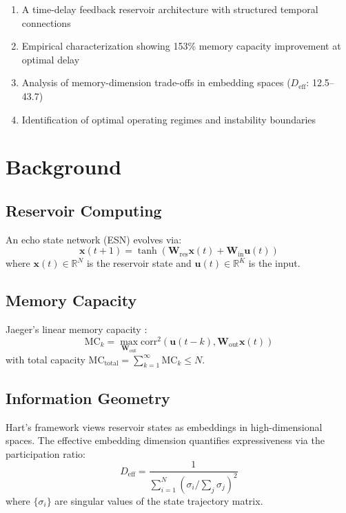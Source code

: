 \documentclass[11pt]{article}
\begin{document}
\begin{enumerate}
\item A time-delay feedback reservoir architecture with structured temporal connections
\item Empirical characterization showing 153\% memory capacity improvement at optimal delay
\item Analysis of memory-dimension trade-offs in embedding spaces ($D_{\text{eff}}$: 12.5--43.7)
\item Identification of optimal operating regimes and instability boundaries
\end{enumerate}

\section{Background}

\subsection{Reservoir Computing}

An echo state network (ESN) evolves via:
\begin{equation}
\mathbf{x}(t+1) = \tanh(\mathbf{W}_{\text{res}}\mathbf{x}(t) + \mathbf{W}_{\text{in}}\mathbf{u}(t))
\end{equation}
where $\mathbf{x}(t) \in \mathbb{R}^N$ is the reservoir state and $\mathbf{u}(t) \in \mathbb{R}^K$ is the input.

\subsection{Memory Capacity}

Jaeger's linear memory capacity \cite{jaeger2001}:
\begin{equation}
\text{MC}_k = \max_{\mathbf{W}_{\text{out}}} \text{corr}^2(\mathbf{u}(t-k), \mathbf{W}_{\text{out}}\mathbf{x}(t))
\end{equation}
with total capacity $\text{MC}_{\text{total}} = \sum_{k=1}^{\infty} \text{MC}_k \leq N$.

\subsection{Information Geometry}

Hart's framework \cite{hart2021thesis} views reservoir states as embeddings in high-dimensional spaces. The effective embedding dimension quantifies expressiveness via the participation ratio:
\begin{equation}
D_{\text{eff}} = \frac{1}{\sum_{i=1}^{N} (\sigma_i / \sum_j \sigma_j)^2}
\end{equation}
where $\{\sigma_i\}$ are singular values of the state trajectory matrix.
\end{document}
